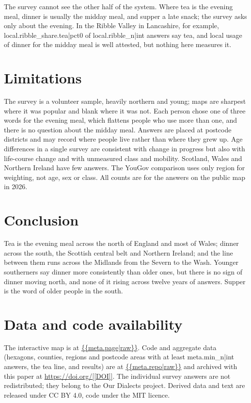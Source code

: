 \documentclass[11pt,a4paper]{article}
\begin{document}
The survey cannot see the other half of the system. Where tea is the evening meal, dinner is usually the midday meal, and supper a late snack; the survey asks only about the evening. In the Ribble Valley in Lancashire, for example, {{local.ribble_share.tea|pct0}} of {{local.ribble_n|int}} answers say tea, and local usage of dinner for the midday meal is well attested, but nothing here measures it.

\section{Limitations}
The survey is a volunteer sample, heavily northern and young; maps are sharpest where it was popular and blank where it was not. Each person chose one of three words for the evening meal, which flattens people who use more than one, and there is no question about the midday meal. Answers are placed at postcode districts and may record where people live rather than where they grew up. Age differences in a single survey are consistent with change in progress but also with life-course change and with unmeasured class and mobility. Scotland, Wales and Northern Ireland have few answers. The YouGov comparison uses only region for weighting, not age, sex or class. All counts are for the answers on the public map in 2026.

\section{Conclusion}
Tea is the evening meal across the north of England and most of Wales; dinner across the south, the Scottish central belt and Northern Ireland; and the line between them runs across the Midlands from the Severn to the Wash. Younger southerners say dinner more consistently than older ones, but there is no sign of dinner moving north, and none of it rising across twelve years of answers. Supper is the word of older people in the south.

\section*{Data and code availability}
The interactive map is at \url{{{meta.page|raw}}}. Code and aggregate data (hexagons, counties, regions and postcode areas with at least {{meta.min_n|int}} answers, the tea line, and results) are at \url{{{meta.repo|raw}}} and archived with this paper at \url{https://doi.org/[[DOI]]}. The individual survey answers are not redistributed; they belong to the Our Dialects project. Derived data and text are released under CC BY 4.0, code under the MIT licence.
\end{document}
